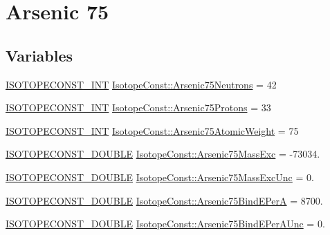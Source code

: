 \hypertarget{group___isotope_const-_arsenic-_as75}{}\section{Arsenic 75}
\label{group___isotope_const-_arsenic-_as75}
\subsection*{Variables}
\begin{DoxyCompactItemize}
\item 
\mbox{\hyperlink{group___isotope_const-_macros_ga5f18360b3e99483a35c32d789e62621c}{I\+S\+O\+T\+O\+P\+E\+C\+O\+N\+S\+T\+\_\+\+I\+NT}} \mbox{\hyperlink{group___isotope_const-_arsenic-_as75_ga03d2c3c72598252302179810400bf138}{Isotope\+Const\+::\+Arsenic75\+Neutrons}} = 42
\item 
\mbox{\hyperlink{group___isotope_const-_macros_ga5f18360b3e99483a35c32d789e62621c}{I\+S\+O\+T\+O\+P\+E\+C\+O\+N\+S\+T\+\_\+\+I\+NT}} \mbox{\hyperlink{group___isotope_const-_arsenic-_as75_ga4bf4a24a55ea339cf3b66050a4fd91c0}{Isotope\+Const\+::\+Arsenic75\+Protons}} = 33
\item 
\mbox{\hyperlink{group___isotope_const-_macros_ga5f18360b3e99483a35c32d789e62621c}{I\+S\+O\+T\+O\+P\+E\+C\+O\+N\+S\+T\+\_\+\+I\+NT}} \mbox{\hyperlink{group___isotope_const-_arsenic-_as75_ga2bfb248a85c6697ec13e469915b8ff06}{Isotope\+Const\+::\+Arsenic75\+Atomic\+Weight}} = 75
\item 
\mbox{\hyperlink{group___isotope_const-_macros_ga8f45a7272ce02c0b4c65c44636ed719a}{I\+S\+O\+T\+O\+P\+E\+C\+O\+N\+S\+T\+\_\+\+D\+O\+U\+B\+LE}} \mbox{\hyperlink{group___isotope_const-_arsenic-_as75_ga3580daa86dcf62e509da3e45d176e9f3}{Isotope\+Const\+::\+Arsenic75\+Mass\+Exc}} = -\/73034.
\item 
\mbox{\hyperlink{group___isotope_const-_macros_ga8f45a7272ce02c0b4c65c44636ed719a}{I\+S\+O\+T\+O\+P\+E\+C\+O\+N\+S\+T\+\_\+\+D\+O\+U\+B\+LE}} \mbox{\hyperlink{group___isotope_const-_arsenic-_as75_ga14c2cd2f89d723917f474b4c6834e754}{Isotope\+Const\+::\+Arsenic75\+Mass\+Exc\+Unc}} = 0.
\item 
\mbox{\hyperlink{group___isotope_const-_macros_ga8f45a7272ce02c0b4c65c44636ed719a}{I\+S\+O\+T\+O\+P\+E\+C\+O\+N\+S\+T\+\_\+\+D\+O\+U\+B\+LE}} \mbox{\hyperlink{group___isotope_const-_arsenic-_as75_ga2e469072c85f880824bfa5183e41ec3b}{Isotope\+Const\+::\+Arsenic75\+Bind\+E\+PerA}} = 8700.
\item 
\mbox{\hyperlink{group___isotope_const-_macros_ga8f45a7272ce02c0b4c65c44636ed719a}{I\+S\+O\+T\+O\+P\+E\+C\+O\+N\+S\+T\+\_\+\+D\+O\+U\+B\+LE}} \mbox{\hyperlink{group___isotope_const-_arsenic-_as75_gac9b51939486927a840a20bb6ca1bf58b}{Isotope\+Const\+::\+Arsenic75\+Bind\+E\+Per\+A\+Unc}} = 0.

\end{DoxyCompactItemize}
